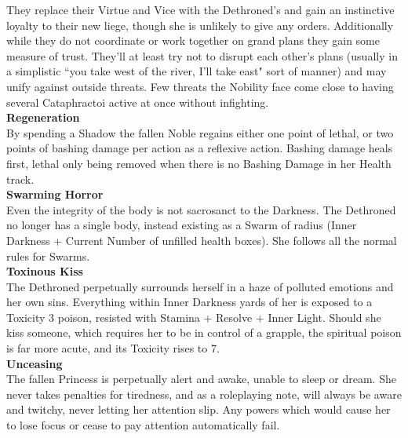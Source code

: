 They replace their Virtue and Vice with the Dethroned's and gain an instinctive loyalty to their new liege, though she is unlikely to give any orders. Additionally while they do not coordinate or work together on grand plans they gain some measure of trust. They'll at least try not to disrupt each other’s plans (usually in a simplistic \textquotedblleft you take west of the river, I'll take east" sort of manner) and may unify against outside threats. Few threats the Nobility face come close to having several Cataphractoi active at once without infighting.\\

\noindent \textbf{Regeneration}\\

\noindent By spending a Shadow the fallen Noble regains either one point of lethal, or two points of bashing damage per action as a reflexive action. Bashing damage heals first, lethal only being removed when there is no Bashing Damage in her Health track.\\

\noindent \textbf{Swarming Horror}\\

\noindent Even the integrity of the body is not sacrosanct to the Darkness. The Dethroned no longer has a single body, instead existing as a Swarm of radius (Inner Darkness + Current Number of unfilled health boxes). She follows all the normal rules for Swarms.\\

\noindent \textbf{Toxinous Kiss}\\

\noindent The Dethroned perpetually surrounds herself in a haze of polluted emotions and her own sins. Everything within Inner Darkness yards of her is exposed to a Toxicity 3 poison, resisted with Stamina + Resolve + Inner Light. Should she kiss someone, which requires her to be in control of a grapple, the spiritual poison is far more acute, and its Toxicity rises to 7.\\

\noindent \textbf{Unceasing}\\

\noindent The fallen Princess is perpetually alert and awake, unable to sleep or dream. She never takes penalties for tiredness, and as a roleplaying note, will always be aware and twitchy, never letting her attention slip. Any powers which would cause her to lose focus or cease to pay attention automatically fail.\\

